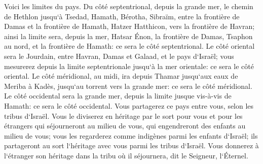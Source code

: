 \verse Voici les limites du pays. Du côté septentrional, depuis la grande mer, le chemin de Hethlon jusqu`à Tsedad, 
\verse Hamath, Bérotha, Sibraïm, entre la frontière de Damas et la frontière de Hamath, Hatzer Hatthicon, vers la frontière de Havran; 
\verse ainsi la limite sera, depuis la mer, Hatsar Énon, la frontière de Damas, Tsaphon au nord, et la frontière de Hamath: ce sera le côté septentrional. 
\verse Le côté oriental sera le Jourdain, entre Havran, Damas et Galaad, et le pays d`Israël; vous mesurerez depuis la limite septentrionale jusqu`à la mer orientale: ce sera le côté oriental. 
\verse Le côté méridional, au midi, ira depuis Thamar jusqu`aux eaux de Meriba à Kadès, jusqu`au torrent vers la grande mer: ce sera le côté méridional. 
\verse Le côté occidental sera la grande mer, depuis la limite jusque vis-à-vis de Hamath: ce sera le côté occidental. 
\verse Vous partagerez ce pays entre vous, selon les tribus d`Israël. 
\verse Vous le diviserez en héritage par le sort pour vous et pour les étrangers qui séjourneront au milieu de vous, qui engendreront des enfants au milieu de vous; vous les regarderez comme indigènes parmi les enfants d`Israël; ils partageront au sort l`héritage avec vous parmi les tribus d`Israël. 
\verse Vous donnerez à l`étranger son héritage dans la tribu où il séjournera, dit le Seigneur, l`Éternel. 

